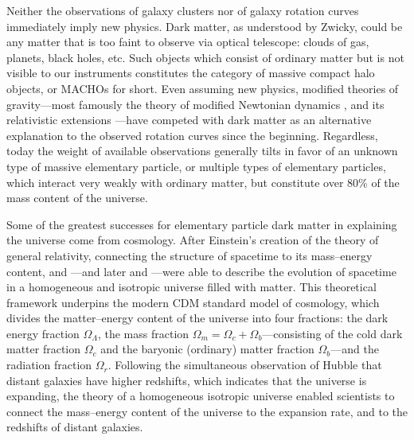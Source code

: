 \documentclass[b5paper, 10pt, twoside]{book}
\begin{document}
Neither the observations of galaxy clusters nor of galaxy rotation curves immediately imply new physics. Dark matter, as understood by Zwicky, could be any matter that is too faint to observe via optical telescope: clouds of gas, planets, black holes, etc. Such objects which consist of ordinary matter but is not visible to our instruments constitutes the category of massive compact halo objects, or MACHOs for short. Even assuming new physics, modified theories of gravity---most famously the theory of modified Newtonian dynamics \parencite{Milgrom1983}, and its relativistic extensions \parencites{Bekenstein2004, Milgrom2009, SkordisZlosnik2021}---have competed with dark matter as an alternative explanation to the observed rotation curves since the beginning. Regardless, today the weight of available observations generally tilts in favor of an unknown type of massive elementary particle, or multiple types of elementary particles, which interact very weakly with ordinary matter, but constitute over 80\% of the mass content of the universe.

Some of the greatest successes for elementary particle dark matter in explaining the universe come from cosmology. After Einstein's creation of the theory of general relativity, connecting the structure of spacetime to its mass--energy content, \textcites{Friedmann1922, Friedmann1924} and \textcite{Lemaitre1927}---and later \textcites{Robertson1935, Robertson1936a, Robertson1936b} and \textcite{Walker1937}---were able to describe the evolution of spacetime in a homogeneous and isotropic universe filled with matter. This theoretical framework underpins the modern \textLambda{}CDM standard model of cosmology, which divides the matter--energy content of the universe into four fractions: the dark energy fraction $\Omega_\Lambda$, the mass fraction $\Omega_m=\Omega_c+\Omega_b$---consisting of the cold dark matter fraction $\Omega_c$ and the baryonic (ordinary) matter fraction $\Omega_b$---and the radiation fraction $\Omega_r$. Following the simultaneous observation of Hubble that distant galaxies have higher redshifts, which indicates that the universe is expanding, the theory of a homogeneous isotropic universe enabled scientists to connect the mass--energy content of the universe to the expansion rate, and to the redshifts of distant galaxies.
\end{document}
